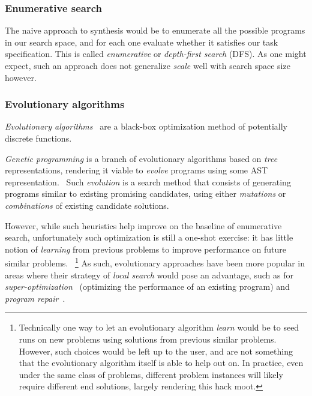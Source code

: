 \documentclass{article}
\begin{document}
\subsubsection{Enumerative search}

The naive approach to synthesis would be to enumerate all the possible programs in our search space,
and for each one evaluate whether it satisfies our task specification.
This is called \emph{enumerative} or \emph{depth-first search} (DFS).
As one might expect, such an approach does not generalize \emph{scale} well with search space size however.

\subsubsection{Evolutionary algorithms}

\emph{Evolutionary algorithms}~\citep{eiben2003introduction} are a black-box optimization method of potentially discrete functions.

\emph{Genetic programming} is a branch of evolutionary algorithms based on \emph{tree} representations,
rendering it viable to \emph{evolve} programs using some AST representation.~\citep{koza1994genetic}
Such \emph{evolution} is a search method that consists of generating programs similar to existing promising candidates, using either \emph{mutations} or \emph{combinations} of existing candidate solutions.

However, while such heuristics help improve on the baseline of enumerative search,
unfortunately such optimization is still a one-shot exercise:
it has little notion of \emph{learning} from previous problems to improve performance on future similar problems.%
~\footnote{
    Technically one way to let an evolutionary algorithm \emph{learn} would be to seed runs on new problems using solutions from previous similar problems.
    However, such choices would be left up to the user,
    and are not something that the evolutionary algorithm itself is able to help out on.
    In practice, even under the same class of problems,
    different problem instances will likely require different end solutions,
    largely rendering this hack moot.
}
As such, evolutionary approaches have been more popular in areas where their strategy of \emph{local search} would pose an advantage, such as for \emph{super-optimization}~\citep{schkufza2016stochastic} (optimizing the performance of an existing program) and \emph{program repair}~\citep{weimer2009automatically,forrest2009genetic}.
\end{document}
